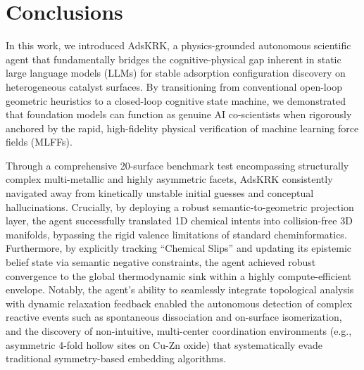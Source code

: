 \documentclass{article}
\begin{document}
\section{Conclusions}
In this work, we introduced AdsKRK, a physics-grounded autonomous scientific agent that fundamentally bridges the cognitive-physical gap inherent in static large language models (LLMs) for stable adsorption configuration discovery on heterogeneous catalyst surfaces. By transitioning from conventional open-loop geometric heuristics to a closed-loop cognitive state machine, we demonstrated that foundation models can function as genuine AI co-scientists when rigorously anchored by the rapid, high-fidelity physical verification of machine learning force fields (MLFFs).

Through a comprehensive 20-surface benchmark test encompassing structurally complex multi-metallic and highly asymmetric facets, AdsKRK consistently navigated away from kinetically unstable initial guesses and conceptual hallucinations. Crucially, by deploying a robust semantic-to-geometric projection layer, the agent successfully translated 1D chemical intents into collision-free 3D manifolds, bypassing the rigid valence limitations of standard cheminformatics. Furthermore, by explicitly tracking ``Chemical Slips'' and updating its epistemic belief state via semantic negative constraints, the agent achieved robust convergence to the global thermodynamic sink within a highly compute-efficient envelope. Notably, the agent's ability to seamlessly integrate topological analysis with dynamic relaxation feedback enabled the autonomous detection of complex reactive events such as spontaneous dissociation and on-surface isomerization, and the discovery of non-intuitive, multi-center coordination environments (e.g., asymmetric 4-fold hollow sites on Cu-Zn oxide) that systematically evade traditional symmetry-based embedding algorithms.
\end{document}
